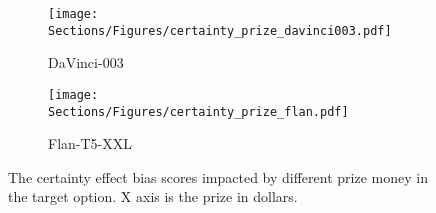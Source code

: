 \begin{figure}[t!]
\centering
\begin{subfigure}[th!]{0.5\textwidth}
\centering
    \texttt{[image: Sections/Figures/certainty\_prize\_davinci003.pdf]}
    \caption{DaVinci-003}
    \label{fig:certainty_prize_davinci003}
\end{subfigure}%
\hfill
\begin{subfigure}[th!]{0.5\textwidth}
\centering
    \texttt{[image: Sections/Figures/certainty\_prize\_flan.pdf]}
    \caption{Flan-T5-XXL}
    \label{fig:certainty_prize_flan}
\end{subfigure}
\caption{The certainty effect bias scores impacted by different prize money in the target option. X axis is the prize in dollars.}
\label{fig:certainty_prize}
\end{figure}